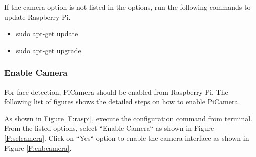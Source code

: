 \documentclass[sigconf]{acmart}
\begin{document}
If the camera option is not listed in the options, run the following commands to update Raspberry Pi.
\begin{itemize}
\item sudo apt-get update
\item sudo apt-get upgrade
\end{itemize}

\subsubsection{Enable Camera}
For face detection, PiCamera should be enabled from Raspberry Pi. The following list of 
figures shows the detailed steps on how to enable PiCamera.

As shown in Figure \ref{F:raspi}, execute the configuration command from terminal. 
From the listed options, select ``Enable Camera`` as shown in Figure \ref{F:selcamera}. 
Click on ``Yes`` option to enable the camera interface as shown in Figure \ref{F:enbcamera}.
\end{document}
